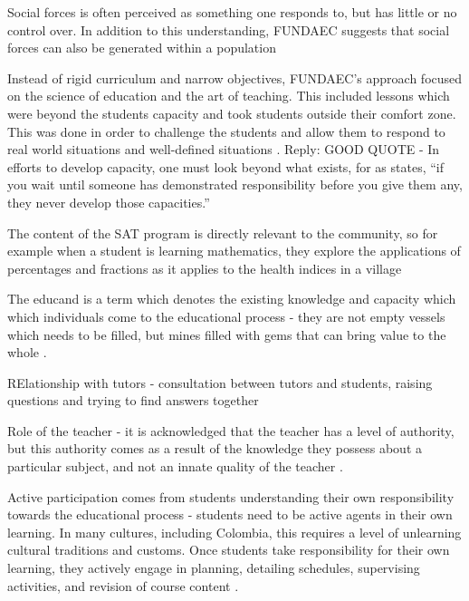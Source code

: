 Social forces is often perceived as something one responds to, but has little or no control over. In addition to this understanding, FUNDAEC suggests that social forces can also be generated within a population \citep{Arbab1988}

Instead of rigid curriculum and narrow objectives, FUNDAEC's approach focused on the science of education and the art of teaching. This included lessons which were beyond the students capacity and took students outside their comfort zone. This was done in order to challenge the students and allow them to respond to real world situations and well-defined situations \citep{Arbab1988}. Reply: GOOD QUOTE - In efforts to develop capacity, one must look beyond what exists, for as \citet{Sercombe2010} states, “if you wait until someone has demonstrated responsibility before you give them any, they never develop those capacities.” %

The content of the SAT program is directly relevant to the community, so for example when a student is learning mathematics, they explore the applications of percentages and fractions as it applies to the health indices in a village \citep{Arbab1988}

The educand is a term which denotes the existing knowledge and capacity which which individuals come to the educational process - they are not empty vessels which needs to be filled, but mines filled with gems that can bring value to the whole \citep{Arbab1988}.

RElationship with tutors - consultation between tutors and students, raising questions and trying to find answers together \citep{Arbab1988}

Role of the teacher - it is acknowledged that the teacher has a level of authority, but this authority comes as a result of the knowledge they possess about a particular subject, and not an innate quality of the teacher \citep{Arbab1988}.

Active participation comes from students understanding their own responsibility towards the educational process - students need to be active agents in their own learning. In many cultures, including Colombia, this requires a level of unlearning cultural traditions and customs. Once students take responsibility for their own learning, they actively engage in planning, detailing schedules, supervising activities, and revision of course content \citep{Arbab1988}.

